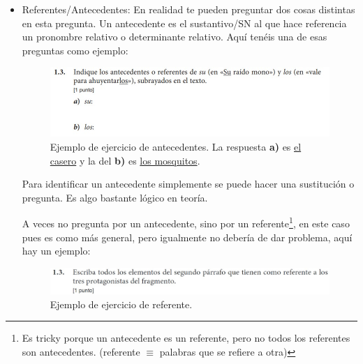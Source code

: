 \documentclass[arial,a4paper,print]{article}
\begin{document}
\begin{itemize}
\item Referentes/Antecedentes: En realidad te pueden preguntar dos cosas distintas en esta pregunta.  Un antecedente es el sustantivo/SN al que hace referencia un pronombre relativo o determinante relativo. Aquí tenéis una de esas preguntas como ejemplo:
\begin{figure}[H]
	\centering
	\includegraphics[width=0.8\linewidth]{figures/antecedente}
	\caption{Ejemplo de ejercicio de antecedentes. La respuesta \textbf{a)} es \underline{el casero} y la del \textbf{b)} es \underline{los mosquitos}.}
	\label{fig:antecedente}
\end{figure}

Para identificar un antecedente simplemente se puede hacer una sustitución o pregunta. Es algo bastante lógico en teoría. 

A veces no pregunta por un antecedente, sino por un referente\footnote{Es tricky porque un antecedente es un referente, pero no todos los referentes son antecedentes. (referente $\equiv$ palabras que se refiere a otra)}, en este caso pues es como más general, pero igualmente no debería de dar problema, aquí hay un ejemplo:
\begin{figure}[H]
	\centering
	\includegraphics[width=0.8\linewidth]{figures/referente}
	\caption{Ejemplo de ejercicio de referente.}
	\label{fig:referente}
\end{figure}


\end{itemize}
\end{document}

